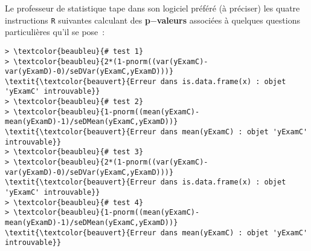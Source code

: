 \documentclass[]{article}
\begin{document}
Le professeur de statistique tape dans son logiciel préféré (à préciser) les quatre instructions \texttt{R} suivantes calculant des \textbf{p$-$valeurs} associées à quelques questions particuli{\`e}res qu'il se pose~:


\begin{Verbatim}[commandchars=\\\{\},fontfamily=courier,fontseries=b,fontsize=\small]
> \textcolor{beaubleu}{# test 1}
> \textcolor{beaubleu}{2*(1-pnorm((var(yExamC)-var(yExamD)-0)/seDVar(yExamC,yExamD)))}
\textit{\textcolor{beauvert}{Erreur dans is.data.frame(x) : objet 'yExamC' introuvable}}
> \textcolor{beaubleu}{# test 2}
> \textcolor{beaubleu}{1-pnorm((mean(yExamC)-mean(yExamD)-1)/seDMean(yExamC,yExamD))}
\textit{\textcolor{beauvert}{Erreur dans mean(yExamC) : objet 'yExamC' introuvable}}
> \textcolor{beaubleu}{# test 3}
> \textcolor{beaubleu}{2*(1-pnorm((var(yExamC)-var(yExamD)-0)/seDVar(yExamC,yExamD)))}
\textit{\textcolor{beauvert}{Erreur dans is.data.frame(x) : objet 'yExamC' introuvable}}
> \textcolor{beaubleu}{# test 4}
> \textcolor{beaubleu}{1-pnorm((mean(yExamC)-mean(yExamD)-1)/seDMean(yExamC,yExamD))}
\textit{\textcolor{beauvert}{Erreur dans mean(yExamC) : objet 'yExamC' introuvable}}
\end{Verbatim}
\end{document}
